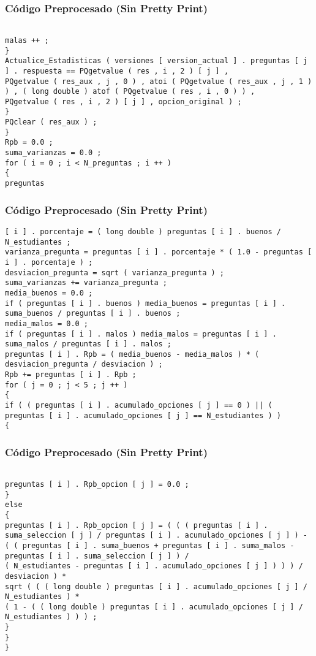 \documentclass{beamer}
\begin{document}
\begin{frame}[fragile]
\frametitle{C\'odigo Preprocesado (Sin Pretty Print)}
\begin{lstlisting}[style=CStyle]

malas ++ ; 
} 
Actualice_Estadisticas ( versiones [ version_actual ] . preguntas [ j ] . respuesta == PQgetvalue ( res , i , 2 ) [ j ] , 
PQgetvalue ( res_aux , j , 0 ) , atoi ( PQgetvalue ( res_aux , j , 1 ) ) , ( long double ) atof ( PQgetvalue ( res , i , 0 ) ) , 
PQgetvalue ( res , i , 2 ) [ j ] , opcion_original ) ; 
} 
PQclear ( res_aux ) ; 
} 
Rpb = 0.0 ; 
suma_varianzas = 0.0 ; 
for ( i = 0 ; i < N_preguntas ; i ++ ) 
{ 
preguntas \end{lstlisting}
\end{frame}
\begin{frame}[fragile]
\frametitle{C\'odigo Preprocesado (Sin Pretty Print)}
\begin{lstlisting}[style=CStyle]
[ i ] . porcentaje = ( long double ) preguntas [ i ] . buenos / N_estudiantes ; 
varianza_pregunta = preguntas [ i ] . porcentaje * ( 1.0 - preguntas [ i ] . porcentaje ) ; 
desviacion_pregunta = sqrt ( varianza_pregunta ) ; 
suma_varianzas += varianza_pregunta ; 
media_buenos = 0.0 ; 
if ( preguntas [ i ] . buenos ) media_buenos = preguntas [ i ] . suma_buenos / preguntas [ i ] . buenos ; 
media_malos = 0.0 ; 
if ( preguntas [ i ] . malos ) media_malos = preguntas [ i ] . suma_malos / preguntas [ i ] . malos ; 
preguntas [ i ] . Rpb = ( media_buenos - media_malos ) * ( desviacion_pregunta / desviacion ) ; 
Rpb += preguntas [ i ] . Rpb ; 
for ( j = 0 ; j < 5 ; j ++ ) 
{ 
if ( ( preguntas [ i ] . acumulado_opciones [ j ] == 0 ) || ( preguntas [ i ] . acumulado_opciones [ j ] == N_estudiantes ) ) 
{ \end{lstlisting}
\end{frame}
\begin{frame}[fragile]
\frametitle{C\'odigo Preprocesado (Sin Pretty Print)}
\begin{lstlisting}[style=CStyle]

preguntas [ i ] . Rpb_opcion [ j ] = 0.0 ; 
} 
else 
{ 
preguntas [ i ] . Rpb_opcion [ j ] = ( ( ( preguntas [ i ] . suma_seleccion [ j ] / preguntas [ i ] . acumulado_opciones [ j ] ) - 
( ( preguntas [ i ] . suma_buenos + preguntas [ i ] . suma_malos - preguntas [ i ] . suma_seleccion [ j ] ) / 
( N_estudiantes - preguntas [ i ] . acumulado_opciones [ j ] ) ) ) / 
desviacion ) * 
sqrt ( ( ( long double ) preguntas [ i ] . acumulado_opciones [ j ] / N_estudiantes ) * 
( 1 - ( ( long double ) preguntas [ i ] . acumulado_opciones [ j ] / N_estudiantes ) ) ) ; 
} 
} 
} \end{lstlisting}
\end{frame}
\end{document}
